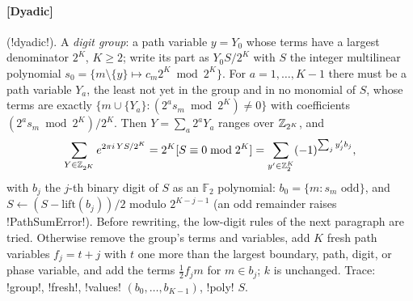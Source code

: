 \paragraph{[Dyadic]} (\code!dyadic!). A \emph{digit group}: a path variable $y=Y_0$ whose terms have a largest denominator $2^K$, $K\ge2$; write its part as $Y_0S/2^K$ with $S$ the integer multilinear polynomial $s_0=\{m\setminus\{y\}\mapsto c_m2^K\bmod 2^K\}$. For $a=1,\ldots,K-1$ there must be a path variable $Y_a$, the least not yet in the group and in no monomial of $S$, whose terms are exactly $\{m\cup\{Y_a\}: (2^a s_m\bmod 2^K)\ne0\}$ with coefficients $(2^as_m\bmod2^K)/2^K$. Then $Y=\sum_a2^aY_a$ ranges over $\mathbb{Z}_{2^K}$, and
\begin{equation}
\sum_{Y\in\mathbb{Z}_{2^K}}e^{2\pi i\,YS/2^K}=2^K[S\equiv0\bmod 2^K]=\sum_{y'\in\mathbb{Z}_{2}^K}(-1)^{\sum_jy'_jb_j},
\end{equation}
with $b_j$ the $j$-th binary digit of $S$ as an $\mathbb{F}_2$ polynomial: $b_0=\{m:s_m\text{ odd}\}$, and $S\leftarrow(S-\mathrm{lift}(b_j))/2$ modulo $2^{K-j-1}$ (an odd remainder raises \py!PathSumError!). Before rewriting, the low-digit rules of the next paragraph are tried. Otherwise remove the group's terms and variables, add $K$ fresh path variables $f_j=t+j$ with $t$ one more than the largest boundary, path, digit, or phase variable, and add the terms $\tfrac12 f_jm$ for $m\in b_j$; $k$ is unchanged. Trace: \code!group!, \code!fresh!, \code!values! $(b_0,\ldots,b_{K-1})$, \code!poly! $S$.


